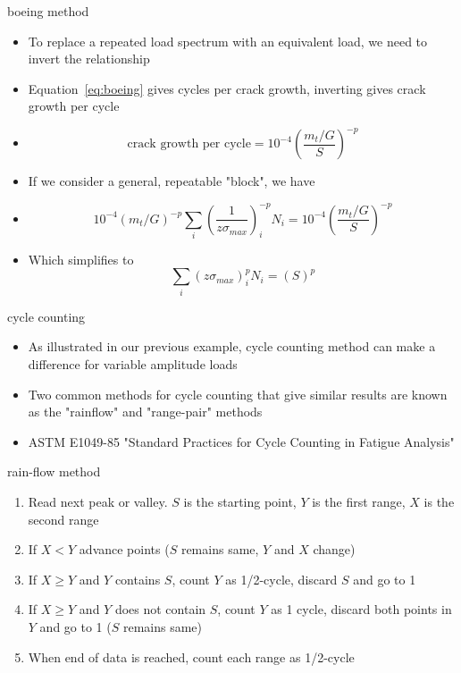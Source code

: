 \documentclass[10pt]{beamer}
\begin{document}
\begin{frame}{boeing method}
	\begin{itemize}[<+->]
		\item To replace a repeated load spectrum with an equivalent load, we need to invert the relationship
		\item Equation~\ref{eq:boeing} gives cycles per crack growth, inverting gives crack growth per cycle
		\item[] \begin{equation}
		\text{crack growth per cycle} = 10^{-4} \left(\frac{m_t/G}{S}\right)^{-p}
		\end{equation}
		\item If we consider a general, repeatable "block", we have
		\item[] \begin{equation}
		10^{-4} \left( m_t/G \right)^{-p} \sum_i \left( \frac{1}{z\sigma_{max}} \right)_i^{-p} N_i = 10^{-4} \left( \frac{m_t/G}{S} \right)^{-p}
		\end{equation}
		\item Which simplifies to
		\begin{equation}
		\sum_i \left( z\sigma_{max} \right)_i^{p}N_i = \left( S \right)^{p}
		\end{equation}		
	\end{itemize}
\end{frame}

\begin{frame}{cycle counting}
	\begin{itemize}[<+->]
		\item As illustrated in our previous example, cycle counting method can make a difference for variable amplitude loads
		\item Two common methods for cycle counting that give similar results are known as the "rainflow" and "range-pair" methods
		\item ASTM E1049-85 "Standard Practices for Cycle Counting in Fatigue Analysis"
	\end{itemize}
\end{frame}

\begin{frame}{rain-flow method}
	\begin{enumerate}[<+->]
		\item Read next peak or valley. $S$ is the starting point, $Y$ is the first range, $X$ is the second range
		\item If $X < Y$ advance points ($S$ remains same, $Y$ and $X$ change)
		\item If $X \ge Y$ and $Y$ contains $S$, count $Y$ as 1/2-cycle, discard $S$ and go to 1
		\item If $X \ge Y$ and $Y$ does not contain $S$, count $Y$ as 1 cycle, discard both points in $Y$ and go to 1 ($S$ remains same)
		\item When end of data is reached, count each range as 1/2-cycle
	\end{enumerate}
\end{frame}
\end{document}
